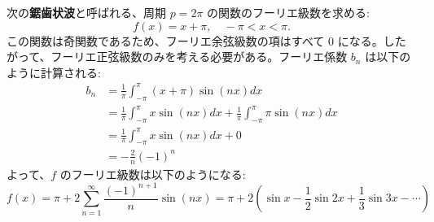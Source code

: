 \documentclass[article,paper=a4paper]{jlreq}
\begin{document}
\begin{ex}
    次の\textbf{鋸歯状波}と呼ばれる、周期 $p=2\pi$ の関数のフーリエ級数を求める:
    \[f(x) = x + \pi, \quad -\pi < x < \pi .\]
    この関数は奇関数であるため、フーリエ余弦級数の項はすべて $0$ になる。したがって、フーリエ正弦級数のみを考える必要がある。フーリエ係数 $b_n$ は以下のように計算される:
\begin{align*}
    b_n &= \frac{1}{\pi} \int_{-\pi}^{\pi} (x + \pi) \sin (nx) dx \\
        &= \frac{1}{\pi} \int_{-\pi}^{\pi} x \sin (nx) dx + \frac{1}{\pi} \int_{-\pi}^{\pi} \pi \sin (nx) dx \\
        &= \frac{1}{\pi} \int_{-\pi}^{\pi} x \sin (nx) dx + 0 \\
        &= -\frac{2}{n} (-1)^n
\end{align*}
    よって、$f$ のフーリエ級数は以下のようになる:
    \[f(x) = \pi + 2 \sum_{n=1}^{\infty} \frac{(-1)^{n+1}}{n} \sin (nx) = \pi + 2 \left( \sin x - \frac{1}{2} \sin 2x + \frac{1}{3} \sin 3x - \cdots \right)\]
\end{ex}

\newcommand{\basecurve}[1]{%
  \draw[#1]
    (0,1.15)
      .. controls (0.18,0.90) and (0.40,0.84) .. (0.58,0.86)
      .. controls (0.76,0.90) and (0.92,1.35) .. (1.00,1.95);
}
\end{document}
